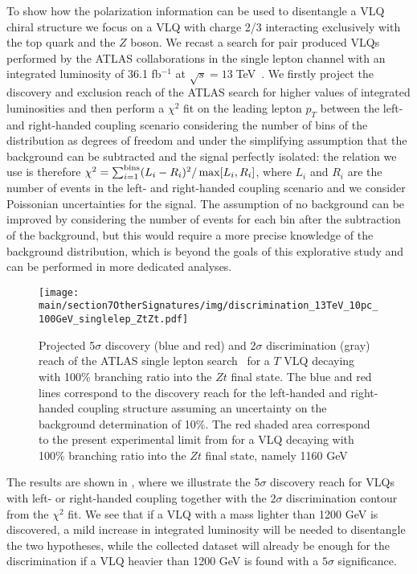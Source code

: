 To show how the polarization information can be used to disentangle a VLQ chiral structure we focus on a VLQ with charge 2/3 interacting exclusively with the top quark and the $Z$ boson. We recast a search for pair produced VLQs performed by the ATLAS collaborations in the single lepton channel with an integrated luminosity of 36.1 fb$^{-1}$ at $\sqrt{s}=13\;$TeV~\cite{Aaboud:2017qpr}. We firstly project the discovery and exclusion reach of the ATLAS search for higher values of integrated luminosities and then perform a $\chi^2$ fit on the leading lepton $p_T$ between the left- and right-handed coupling scenario considering the number of bins of the distribution as degrees of freedom and under the simplifying assumption that the background can be subtracted and the signal perfectly isolated: the relation we use is therefore $\chi^2=\sum_{i=1}^{\rm{bins}} (L_i-R_i)^2/\max[L_i,R_i]$, where $L_i$ and $R_i$ are the number of events in the left- and right-handed coupling scenario and we consider Poissonian uncertainties for the signal. The assumption of no background can be improved by considering the number of events for each bin after the subtraction of the background, but this would require a more precise knowledge of the background distribution, which is beyond the goals of this explorative study and can be performed in more dedicated analyses.

\begin{figure}
\begin{center}
\texttt{[image: \\main/section7OtherSignatures/img/discrimination\_13TeV\_10pc\_100GeV\_singlelep\_ZtZt.pdf]}
\caption{Projected 5$\sigma$ discovery (blue and red) and 2$\sigma$ discrimination (gray) reach of the ATLAS single lepton search~\cite{Aaboud:2017qpr} for a $T$ VLQ decaying with 100\% branching ratio into the $Zt$ final state. The blue and red lines correspond to the discovery reach for the left-handed and right-handed coupling structure assuming an uncertainty on the background determination of 10\%. The red shaded area correspond to the present experimental limit from for a VLQ decaying with 100\% branching ratio into the $Zt$ final state, namely 1160 GeV~\cite{Aaboud:2017qpr}\label{fig:13-discr}}
\end{center}
\end{figure}

The results are shown in , where we illustrate the 5$\sigma$ discovery reach for VLQs with left- or right-handed coupling together with the $2\sigma$ discrimination contour from the $\chi^2$ fit.
We see that if a VLQ with a mass lighter than 1200 GeV is discovered, a mild increase in integrated luminosity will be needed to disentangle the two hypotheses, while the collected dataset will already be enough for the discrimination if a VLQ heavier than 1200 GeV is found with a $5\sigma$ significance.

